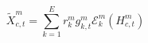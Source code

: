 \begin{equation}
\label{eq:enhanced-sequence}
{\widetilde{X}}_{c,t}^{m}=\sum _{k=1}^{E}{r}_{k}^{m}{g}_{k,t}^{m}{\mathcal{E}}_{k}^{m}\left( {H}_{c,t}^{m}\right) 
\end{equation}
